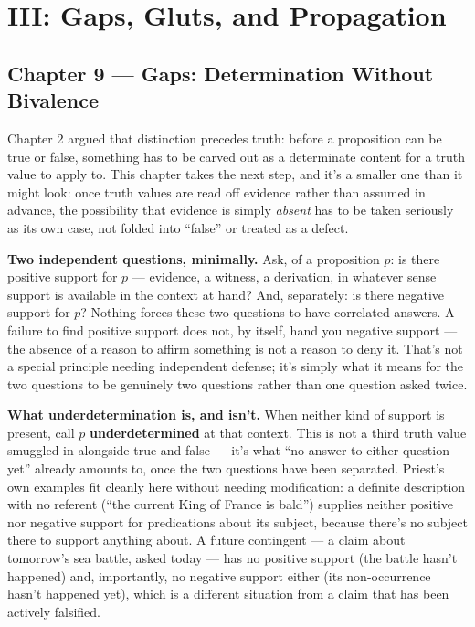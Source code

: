 \part{III: Gaps, Gluts, and Propagation}\label{part-iii-gaps-gluts-and-propagation}

\hypertarget{chapter-9-gaps-determination-without-bivalence}{%
\chapter*{Chapter 9 --- Gaps: Determination Without Bivalence}
\label{chapter-9-gaps-determination-without-bivalence}}

Chapter 2 argued that distinction precedes truth: before a proposition
can be true or false, something has to be carved out as a determinate
content for a truth value to apply to. This chapter takes the next step,
and it's a smaller one than it might look: once truth values are read off
evidence rather than assumed in advance, the possibility that evidence is
simply \emph{absent} has to be taken seriously as its own case, not folded
into ``false'' or treated as a defect.

\textbf{Two independent questions, minimally.} Ask, of a proposition \(p\): is
there positive support for \(p\) --- evidence, a witness, a derivation, in
whatever sense support is available in the context at hand? And,
separately: is there negative support for \(p\)? Nothing forces these two
questions to have correlated answers. A failure to find positive support
does not, by itself, hand you negative support --- the absence of a reason
to affirm something is not a reason to deny it. That's not a special
principle needing independent defense; it's simply what it means for the
two questions to be genuinely two questions rather than one question
asked twice.

\textbf{What underdetermination is, and isn't.} When neither kind of support
is present, call \(p\) \textbf{underdetermined} at that context. This is not a
third truth value smuggled in alongside true and false --- it's what ``no
answer to either question yet'' already amounts to, once the two
questions have been separated. Priest's own examples fit cleanly here
without needing modification: a definite description with no referent
(``the current King of France is bald'') supplies neither positive nor
negative support for predications about its subject, because there's no
subject there to support anything about. A future contingent --- a claim
about tomorrow's sea battle, asked today --- has no positive support (the
battle hasn't happened) and, importantly, no negative support either (its
non-occurrence hasn't happened yet), which is a different situation from
a claim that has been actively falsified.

